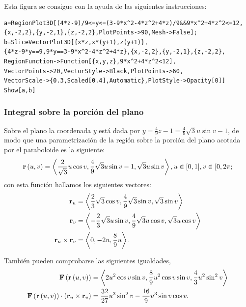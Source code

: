 Esta figura se consigue con la ayuda de las siguientes instrucciones:

\begin{tcolorbox}[title=\bf Instrucción \verb"Mathematica"]\begin{Verbatim}[formatcom=\letraverbatim]
a=RegionPlot3D[(4*z-9)/9<=y<=(3-9*x^2-4*z^2+4*z)/9&&9*x^2+4*z^2<=12,
{x,-2,2},{y,-2,1},{z,-2,2},PlotPoints->90,Mesh->False];
b=SliceVectorPlot3D[{x*z,x*(y+1),z(y+1)},
{4*z-9*y==9,9*y==3-9*x^2-4*z^2+4*z},{x,-2,2},{y,-2,1},{z,-2,2},
RegionFunction->Function[{x,y,z},9*x^2+4*z^2<12],
VectorPoints->20,VectorStyle->Black,PlotPoints->60,
VectorScale->{0.3,Scaled[0.4],Automatic},PlotStyle->Opacity[0]]
Show[a,b]
\end{Verbatim}
\end{tcolorbox}

\subsubsection{Integral sobre la porción del plano}

Sobre el plano la coordenada $y$ está dada por
$y=\frac{4}{9}z-1=\frac{4}{9}\sqrt{3}u\sin v-1$,
de modo que una parametrización de la región sobre la porción del plano acotada por el paraboloide es la siguiente:
\begin{gather*}
{\bf r}\left( u,v\right) =\left\langle \frac{2}{\sqrt{3}}u\cos v,\frac{4}{9}\sqrt{3}u\sin v-1,\sqrt{3}u\sin v\right\rangle,
u\in \lbrack 0,1], v\in\lbrack 0,2\pi;
\end{gather*}
con esta función hallamos los siguientes vectores:
\begin{align*}
{\bf r}_{u} &=\left\langle \frac{2}{3}\sqrt{3}\cos v,\frac{4}{9}\sqrt{3}\sin v,\sqrt{3}\sin v\right\rangle \\
{\bf r}_{v}&=\left\langle -\frac{2}{3}\sqrt{3}u\sin v,\frac{4}{9}\sqrt{3}u\cos v,\sqrt{3}u\cos v\right\rangle \\
{\bf r}_{u}\times {\bf r}_{v}&= \left\langle 0,-2u,\frac{8}{9}u\right\rangle.
\end{align*}

También pueden comprobarse las siguientes igualdades,
\begin{align*}
{\bf F}\left( {\bf r}\left( u,v\right) \right) &= \left\langle 2u^{2}\cos v\sin v,\frac{8}{9}u^{2}\cos v\sin v,\frac{4}{3}u^{2}\sin ^{2}v \right\rangle  \\
{\bf F}\left( {\bf r}\left( u,v\right) \right) \cdot \left( {\bf r}_{u}\times {\bf r}_{v}\right) &=\frac{32}{27}u^{3}\sin ^{2}v-\frac{16}{9}u^{3}\sin v\cos v.
\end{align*}

